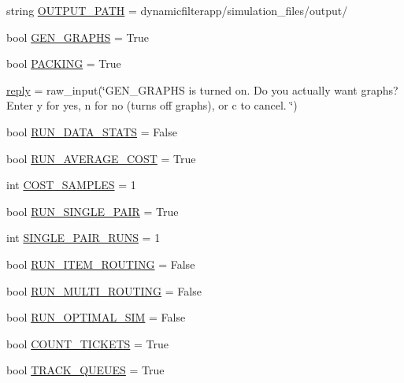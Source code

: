 \begin{DoxyCompactItemize}
\item 
string \mbox{\hyperlink{namespacereorder_a04644ded1d5e3fc8bd58a411209b7886}{O\+U\+T\+P\+U\+T\+\_\+\+P\+A\+TH}} = \textquotesingle{}dynamicfilterapp/simulation\+\_\+files/output/\textquotesingle{}
\item 
bool \mbox{\hyperlink{namespacereorder_a57c1e3f291181d680f3ee118fa5c4ab8}{G\+E\+N\+\_\+\+G\+R\+A\+P\+HS}} = True
\item 
bool \mbox{\hyperlink{namespacereorder_a23735ccf05ebd9212e9ebaab8f652507}{P\+A\+C\+K\+I\+NG}} = True
\item 
\mbox{\hyperlink{namespacereorder_a496267841b3ab9e872499fd2731736ff}{reply}} = raw\+\_\+input(\char`\"{}G\+E\+N\+\_\+\+G\+R\+A\+P\+HS is turned on. Do you actually want graphs? Enter y for yes, n for no (turns off graphs), or c to cancel. \char`\"{})
\item 
bool \mbox{\hyperlink{namespacereorder_a36bc09bc8fbde0df2ea1c5d9ed0cf135}{R\+U\+N\+\_\+\+D\+A\+T\+A\+\_\+\+S\+T\+A\+TS}} = False
\item 
bool \mbox{\hyperlink{namespacereorder_a21f2f0f4c6df7faefb843dd318af3452}{R\+U\+N\+\_\+\+A\+V\+E\+R\+A\+G\+E\+\_\+\+C\+O\+ST}} = True
\item 
int \mbox{\hyperlink{namespacereorder_a134ac33ad7706cd6a24fda5b63c73c65}{C\+O\+S\+T\+\_\+\+S\+A\+M\+P\+L\+ES}} = 1
\item 
bool \mbox{\hyperlink{namespacereorder_ab61137c2de5f99b09789a6e76b7cda4c}{R\+U\+N\+\_\+\+S\+I\+N\+G\+L\+E\+\_\+\+P\+A\+IR}} = True
\item 
int \mbox{\hyperlink{namespacereorder_a70d4dc65db288020e23ca213cd97c0f8}{S\+I\+N\+G\+L\+E\+\_\+\+P\+A\+I\+R\+\_\+\+R\+U\+NS}} = 1
\item 
bool \mbox{\hyperlink{namespacereorder_a41d76408f27c5889dc3f40f066583a9f}{R\+U\+N\+\_\+\+I\+T\+E\+M\+\_\+\+R\+O\+U\+T\+I\+NG}} = False
\item 
bool \mbox{\hyperlink{namespacereorder_a5f084acb116f3a65b90532f6a2ecb81b}{R\+U\+N\+\_\+\+M\+U\+L\+T\+I\+\_\+\+R\+O\+U\+T\+I\+NG}} = False
\item 
bool \mbox{\hyperlink{namespacereorder_a82ca5524da03a0787588ac48df06bb1a}{R\+U\+N\+\_\+\+O\+P\+T\+I\+M\+A\+L\+\_\+\+S\+IM}} = False
\item 
bool \mbox{\hyperlink{namespacereorder_ac35fabae4c109189ac40e759f367ee79}{C\+O\+U\+N\+T\+\_\+\+T\+I\+C\+K\+E\+TS}} = True
\item 
bool \mbox{\hyperlink{namespacereorder_a170d7dba5203e9b2ab89eb541ed83b3a}{T\+R\+A\+C\+K\+\_\+\+Q\+U\+E\+U\+ES}} = True

\end{DoxyCompactItemize}
